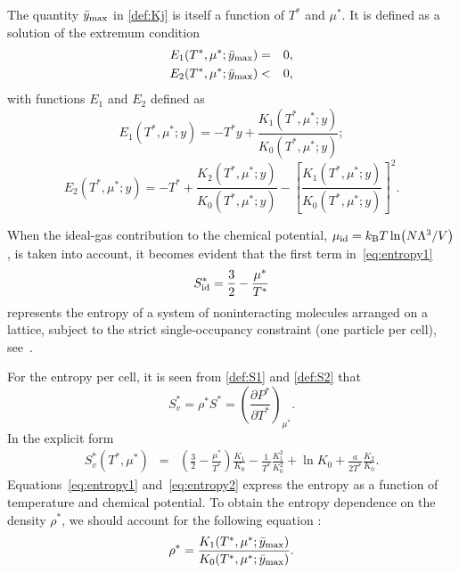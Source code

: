 \documentclass[entropy,article,submit,pdftex,moreauthors]{Definitions/mdpi}
\begin{document}
The quantity $\bar{y}_{\rm max}$ in \eqref{def:Kj} is itself a function of $T^*$ and $\mu^*$. It is defined as a solution of the extremum condition
\begin{eqnarray}
	\label{cond:max}
	E_1(T^*,\mu^*; \bar{y}_{\rm max}) & = & 0,
	\nonumber\\
	E_2(T^*,\mu^*;\bar{y}_{\rm max}) & < & 0,
\end{eqnarray}
with functions $E_1$ and $E_2$ defined as
\begin{equation}
	\label{def:E1}
	E_1(T^*,\mu^*;y) = -T^* y + \frac{K_1(T^*,\mu^*;y)}{K_0(T^*,\mu^*;y)};
\end{equation}
\begin{equation}
	E_2(T^*,\mu^*;y) = -T^*+\frac{K_2(T^*,\mu^*;y)}{K_0(T^*,\mu^*;y)}
	-\left[\frac{K_1(T^*,\mu^*;y)}{K_0(T^*,\mu^*;y)}\right]^2\!.
\end{equation}

When the ideal-gas contribution to the chemical potential, $\mu_{\rm{id}} = k_{\rm{B}}T \ln(N\Lambda^3/V)$, is taken into account, it becomes evident that the first term in~\eqref{eq:entropy1} 
\begin{equation}
	S^*_{\rm id} = \frac{3}{2} - \frac{\mu^*}{T^*}
\end{equation}
represents the entropy of a system of noninteracting molecules arranged on a lattice, subject to the strict single-occupancy constraint (one particle per cell), see~\citep[(47.4)]{Hill56}.

For the entropy per cell, it is seen from \eqref{def:S1} and \eqref{def:S2} that
\begin{equation}
	S^*_v = \rho^* S^* = \left(\frac{\partial P^*}{\partial T^*}\right)_{\mu^*}.
\end{equation}
In the explicit form
\begin{eqnarray}
	\label{eq:entropy2}
	S^{*}_v(T^*,\mu^*) & = & \left(\frac{3}{2} - \frac{\mu^*}{T^*}\right)\frac{K_1}{K_0} - \frac{1}{T^*}\frac{K_1^2}{K_0^2} + \ln K_0 + \frac{a}{2T^*} \frac{K_2}{K_0}.
\end{eqnarray}
Equations~\eqref{eq:entropy1} and~\eqref{eq:entropy2} express the entropy as a function of temperature and chemical potential. To obtain the entropy dependence on the density $\rho^*$, we should account for the following equation \citep[(42)]{RDKPS25arxiv}:
\begin{equation}
	\label{eq:rho_in_y}
	\rho^*=\frac{K_1(T^*,\mu^*;\bar{y}_{\rm max})}{K_0(T^*,\mu^*;\bar{y}_{\rm max})}.
\end{equation}
\end{document}
